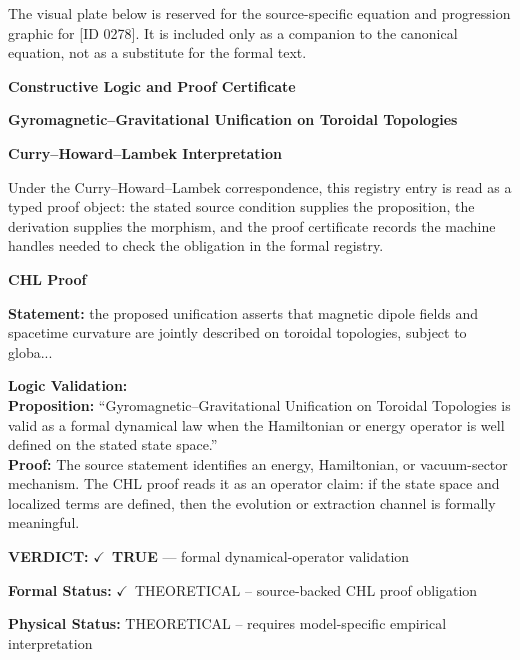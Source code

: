 \begingroup\footnotesize\sloppy
The visual plate below is reserved for the source-specific equation and progression graphic for [ID 0278]. It is included only as a companion to the canonical equation, not as a substitute for the formal text.
\par\endgroup
\ifTZPDarkEdition
{}
\fi

\clearpage
\begingroup\tzpsupportsetup
\noindent\textbf{\fontsize{10.8pt}{12.8pt}\selectfont [ID 0278] Constructive Logic and Proof Certificate}\par
\noindent\textbf{\fontsize{10pt}{12pt}\selectfont Gyromagnetic--Gravitational Unification on Toroidal Topologies}\par
\vspace{0.45em}
\begingroup
\footnotesize
\setlength{\parskip}{0.22em}
\setlength{\parindent}{0pt}
\noindent\textbf{Curry--Howard--Lambek Interpretation}\par
Under the Curry--Howard--Lambek correspondence, this registry entry is read as a typed proof
object: the stated source condition supplies the proposition, the derivation supplies the
morphism, and the proof certificate records the machine handles needed to check the obligation
in the formal registry.

\vspace{0.45em}
\noindent\textbf{CHL Proof}\par
\textbf{Statement:} the proposed unification asserts that magnetic dipole fields and spacetime curvature are
jointly described on toroidal topologies, subject to globa...

\textbf{Logic Validation:}\\
\textbf{Proposition:} ``Gyromagnetic--Gravitational Unification on Toroidal Topologies is valid as a formal
dynamical law when the Hamiltonian or energy operator is well defined on the stated
state space.''\\
\textbf{Proof:} The source statement identifies an energy, Hamiltonian, or vacuum-sector mechanism. The
CHL proof reads it as an operator claim: if the state space and localized terms are
defined, then the evolution or extraction channel is formally meaningful.

\textbf{VERDICT:} \ensuremath{\checkmark}\ \textbf{TRUE} --- formal dynamical-operator validation

\textbf{Formal Status:} \ensuremath{\checkmark}\ THEORETICAL -- source-backed CHL proof obligation

\textbf{Physical Status:} THEORETICAL -- requires model-specific empirical interpretation
\par\vspace{0.45em}
\par
\ifTZPDarkEdition
{}
\fi
\endgroup
\endgroup
